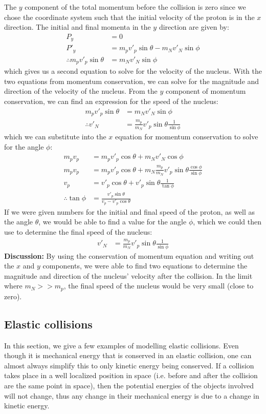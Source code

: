 \begin{example}
The $y$ component of the total momentum before the collision is zero since we chose the coordinate system such that the initial velocity of the proton is in the $x$ direction. The initial and final momenta in the $y$ direction are given by:
\begin{align*}
P_y &= 0\\
P'_y &= m_p v'_p\sin\theta - m_N v'_N\sin\phi\\
\therefore m_p v'_p\sin\theta &= m_N v'_N\sin\phi
\end{align*}
which gives us a second equation to solve for the velocity of the nucleus. With the two equations from momentum conservation, we can solve for the magnitude and direction of the velocity of the nucleus. From the $y$ component of momentum conservation, we can find an expression for the speed of the nucleus:
\begin{align*}
m_p v'_p\sin\theta &= m_N v'_N\sin\phi\\
\therefore v'_N &= \frac{m_p}{m_N}v'_p\sin\theta \frac{1}{\sin\phi}
\end{align*}
which we can substitute into the $x$ equation for momentum conservation to solve for the angle $\phi$:
\begin{align*}
m_p v_p &= m_p v'_p\cos\theta + m_N v'_N\cos\phi\\
m_p v_p &= m_p v'_p\cos\theta + m_N\frac{m_p}{m_N}v'_p\sin\theta \frac{\cos\phi}{\sin\phi} \\
v_p &= v'_p\cos\theta + v'_p\sin\theta \frac{1}{\tan\phi}\\
\therefore \tan\phi &=  \frac{v'_p\sin\theta}{v_p-v'_p\cos\theta}
\end{align*}
If we were given numbers for the initial and final speed of the proton, as well as the angle $\theta$, we would be able to find a value for the angle $\phi$, which we could then use to determine the final speed of the nucleus:
\begin{align*}
 v'_N &= \frac{m_p}{m_N}v'_p\sin\theta \frac{1}{\sin\phi}
\end{align*}
\textbf{Discussion:} By using the conservation of momentum equation and writing out the $x$ and $y$ components, we were able to find two equations to determine the magnitude and direction of the nucleus' velocity after the collision. In the limit where $m_N >> m_p$, the final speed of the nucleus would be very small (close to zero). 
\end{example}




\subsection{Elastic collisions}
In this section, we give a few examples of modelling elastic collisions. Even though it is mechanical energy that is conserved in an elastic collision, one can almost always simplify this to only kinetic energy being conserved. If a collision takes place in a well localized position in space (i.e. before and after the collision are the same point in space), then the potential energies of the objects involved will not change, thus any change in their mechanical energy is due to a change in kinetic energy.


